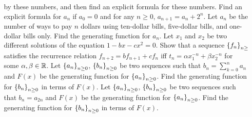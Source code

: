 \begin{chapterendexercises}
    by these numbers, and then find an explicit formula for these numbers.
  \exercise Find an explicit formula for $a_n$ if $a_0 = 0$ and for any
    $n \ge 0$, $a_{n + 1} = a_n + 2^n$.
  \exercise[recommended] Let $a_n$ be the number of ways to pay $n$ dollars using ten-dollar
    bills, five-dollar bills, and one-dollar bills only. Find the generating
    function for $a_n$.
  \exercise[recommended] Let $x_1$ and $x_2$ be two different solutions of the equation
    $1 - bx - cx^2 = 0$. Show that a sequence $\set{f_n}_{n \ge}$ satisfies the
    recurrence relation $f_{n + 2} = b f_{n + 1} + c f_n$ iff
    $t_n = \alpha x_1^{-n} + \beta x_2^{-n}$ for some $\alpha, \beta \in {\mathbb{R}}$.
  \exercise[recommended] Let $\set{a_n}_{n \ge 0}$, $\set{b_n}_{n \ge 0}$ be two sequences
    such that $b_n = \sum_{k = 0}^n a_n$ and $F(x)$ be the generating function
    for $\set{a_n}_{n \ge 0}$. Find the generating function for
    $\set{b_n}_{n \ge 0}$ in terms of $F(x)$.
  \exercise Let $\set{a_n}_{n \ge 0}$, $\set{b_n}_{n \ge 0}$ be two sequences
    such that $b_n = a_{2n}$ and $F(x)$ be the generating function
    for $\set{a_n}_{n \ge 0}$. Find the generating function for
    $\set{b_n}_{n \ge 0}$ in terms of $F(x)$.
\end{chapterendexercises}

